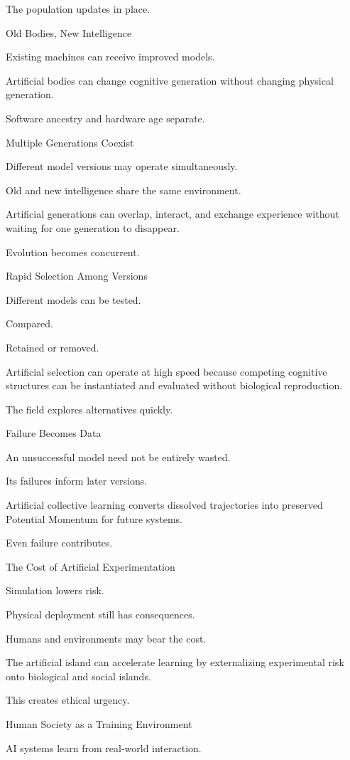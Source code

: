 The population updates in place.

Old Bodies, New Intelligence

Existing machines can receive improved models.

Artificial bodies can change cognitive generation without changing physical generation.

Software ancestry and hardware age separate.

Multiple Generations Coexist

Different model versions may operate simultaneously.

Old and new intelligence share the same environment.

Artificial generations can overlap, interact, and exchange experience without waiting for one generation to disappear.

Evolution becomes concurrent.

Rapid Selection Among Versions

Different models can be tested.

Compared.

Retained or removed.

Artificial selection can operate at high speed because competing cognitive structures can be instantiated and evaluated without biological reproduction.

The field explores alternatives quickly.

Failure Becomes Data

An unsuccessful model need not be entirely wasted.

Its failures inform later versions.

Artificial collective learning converts dissolved trajectories into preserved Potential Momentum for future systems.

Even failure contributes.

The Cost of Artificial Experimentation

Simulation lowers risk.

Physical deployment still has consequences.

Humans and environments may bear the cost.

The artificial island can accelerate learning by externalizing experimental risk onto biological and social islands.

This creates ethical urgency.

Human Society as a Training Environment

AI systems learn from real-world interaction.


